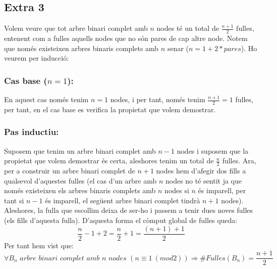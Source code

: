 \documentclass[a4paper,12pt]{article}
\begin{document}
\subsection*{Extra 3}
Volem veure que tot arbre binari complet amb $n$ nodes té un total de $\frac{n+1}{2}$ fulles, entenent com a fulles aquells nodes que no són pares de cap altre node. Notem que només existeixen arbres binaris complets amb $n$ senar ($n = 1 + 2*pares$). Ho veurem per inducció:
\subsubsection*{Cas base ($n = 1$):}
En aquest cas només tenim $n=1$ nodes, i per tant, només tenim $\frac{n+1}{2} = 1$ fulles, per tant, en el cas base es verifica la propietat que volem demostrar.
\subsubsection*{Pas inductiu:}
Suposem que tenim un arbre binari complet amb $n-1$ nodes i suposem que la propietat que volem demostrar és certa, aleshores tenim un total de $\frac{n}{2}$ fulles. Ara, per a construir un arbre binari complet de $n + 1$ nodes hem d'afegir dos fills a qualsevol d'aquestes fulles (el cas d'un arbre amb $n$ nodes no té sentit ja que només existeixen els arbres binaris complets amb $n$ nodes si $n$ és imparell, per tant si $n-1$ és imparell, el següent arbre binari complet tindrà $n+1$ nodes). Aleshores, la fulla que escollim deixa de ser-ho i passem a tenir dues noves fulles (els fills d'aquesta fulla). D'aquesta forma el còmput global de fulles queda:
$$\frac{n}{2} - 1 + 2 = \frac{n}{2} + 1 = \frac{(n+1)+1}{2}$$
Per tant hem vist que:
$$\forall B_n \textit{ arbre binari complet amb n nodes $\left(n \equiv 1 \ (mod 2)\right)$} \Longrightarrow \# Fulles(B_n) = \frac{n+1}{2}$$


\newpage

$$$$

\vfill
\end{document}
